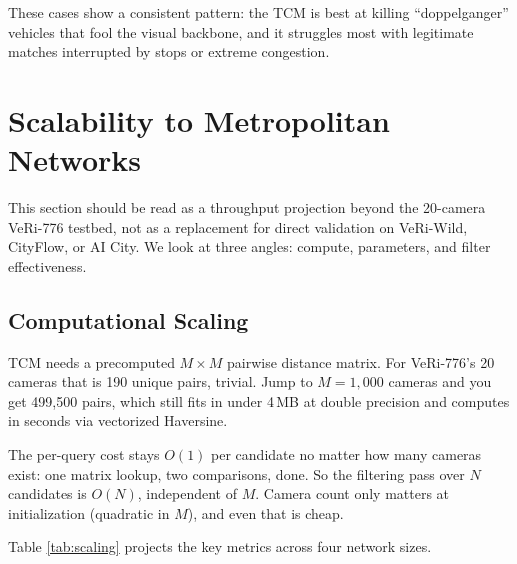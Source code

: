 \documentclass{ijitcs}
\newcommand{\rev}[1]{#1}
\begin{document}
These cases show a consistent pattern: the TCM is best at killing ``doppelganger'' vehicles that fool the visual backbone, and it struggles most with legitimate matches interrupted by stops or extreme congestion.


\section{Scalability to Metropolitan Networks}
\label{sec:scalability}

\rev{This section should be read as a throughput projection beyond the 20-camera VeRi-776 testbed, not as a replacement for direct validation on VeRi-Wild, CityFlow, or AI City.} We look at three angles: compute, parameters, and filter effectiveness.

\subsection{Computational Scaling}
TCM needs a precomputed $M \times M$ pairwise distance matrix. For VeRi-776's 20 cameras that is 190 unique pairs, trivial. Jump to $M = 1{,}000$ cameras and you get 499,500 pairs, which still fits in under 4\,MB at double precision and computes in seconds via vectorized Haversine.

The per-query cost stays $O(1)$ per candidate no matter how many cameras exist: one matrix lookup, two comparisons, done. So the filtering pass over $N$ candidates is $O(N)$, independent of $M$. Camera count only matters at initialization (quadratic in $M$), and even that is cheap.

Table \ref{tab:scaling} projects the key metrics across four network sizes.

\begin{table}[htbp]
\caption{TCM Scaling Projections for Different Network Sizes}
\begin{center}
\label{tab:scaling}
\end{center}
\end{table}
\end{document}
